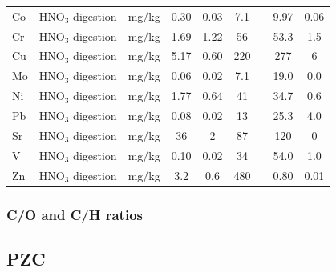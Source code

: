 \begin{table}
{\begin{tabular}{llccccccc}
Co                      & $\mathrm{HNO_3}$ digestion & mg/kg     & 0.30              & 0.03             & 7.1              &                   & 9.97            & 0.06               \\
Cr                      & $\mathrm{HNO_3}$ digestion & mg/kg     & 1.69              & 1.22             & 56               &                   & 53.3            & 1.5                \\
Cu                      & $\mathrm{HNO_3}$ digestion & mg/kg     & 5.17              & 0.60             & 220              &                   & 277             & 6                  \\
Mo                      & $\mathrm{HNO_3}$ digestion & mg/kg     & 0.06              & 0.02             & 7.1              &                   & 19.0            & 0.0                \\
Ni                      & $\mathrm{HNO_3}$ digestion & mg/kg     & 1.77              & 0.64             & 41               &                   & 34.7            & 0.6                \\
Pb                      & $\mathrm{HNO_3}$ digestion & mg/kg     & 0.08              & 0.02             & 13               &                   & 25.3            & 4.0                \\
Sr                      & $\mathrm{HNO_3}$ digestion & mg/kg     & 36                & 2                & 87               &                   & 120             & 0                  \\
V                       & $\mathrm{HNO_3}$ digestion & mg/kg     & 0.10              & 0.02             & 34               &                   & 54.0            & 1.0                \\
Zn                      & $\mathrm{HNO_3}$ digestion & mg/kg     & 3.2               & 0.6              & 480              &                   & 0.80            & 0.01      \\ \bottomrule        
\end{tabular}}
\end{table}

\subsubsection{C/O and C/H ratios}

\subsection{PZC}

